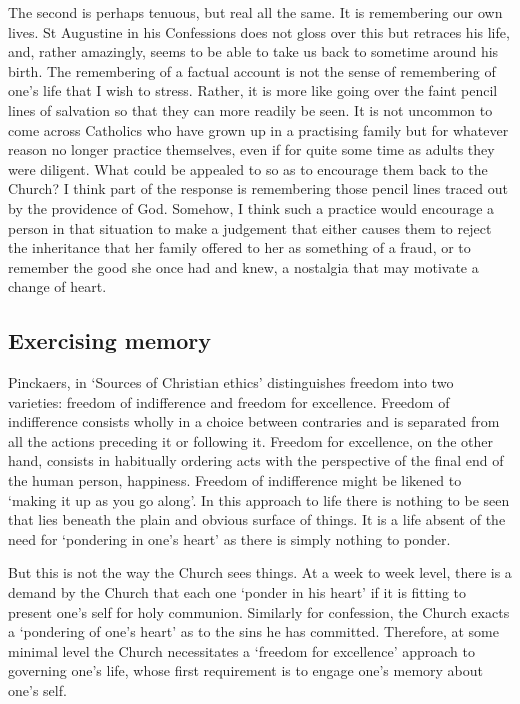 \documentclass[12pt]{article}
\begin{document}
The second is perhaps tenuous, but real all the same. It is remembering our own lives. St Augustine in his Confessions does not gloss over this but retraces his life, and, rather amazingly, seems to be able to take us back to sometime around his birth. The remembering of a factual account is not the sense of remembering of one’s life that I wish to stress. Rather, it is more like going over the faint pencil lines of salvation so that they can more readily be seen. It is not uncommon to come across Catholics who have grown up in a practising family but for whatever reason no longer practice themselves, even if for quite some time as adults they were diligent. What could be appealed to so as to encourage them back to the Church? I think part of the response is remembering those pencil lines traced out by the providence of God. Somehow, I think such a practice would encourage a person in that situation to make a judgement that either causes them to reject the inheritance that her family offered to her as something of a fraud, or to remember the good she once had and knew, a nostalgia that may motivate a change of heart.

\subsection*{Exercising memory}

Pinckaers, in `Sources of Christian ethics' distinguishes freedom into two varieties: freedom of indifference and freedom for excellence. Freedom of indifference consists wholly in a choice between contraries and is separated from all the actions preceding it or following it. Freedom for excellence, on the other hand, consists in habitually ordering acts with the perspective of the final end of the human person, happiness. Freedom of indifference might be likened to `making it up as you go along'. In this approach to life there is nothing to be seen that lies beneath the plain and obvious surface of things. It is a life absent of the need for `pondering in one's heart' as there is simply nothing to ponder.

But this is not the way the Church sees things. At a week to week level, there is a demand by the Church that each one `ponder in his heart' if it is fitting to present one's self for holy communion. Similarly for confession, the Church exacts a `pondering of one's heart' as to the sins he has committed. Therefore, at some minimal level the Church necessitates a `freedom for excellence' approach to governing one's life, whose first requirement is to engage one's memory about one's self.
\end{document}
